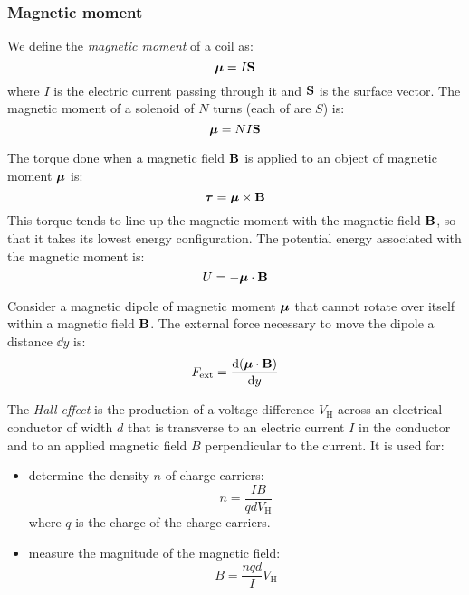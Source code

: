 \documentclass[../../../main.tex]{subfiles}
\begin{document}
\begin{multicols}{2}
  \subsubsection*{Magnetic moment}
  \begin{definition}
    We define the \textit{magnetic moment} of a coil as: $$\vb*{\mu}=I\vb{S}$$ where $I$ is the electric current passing through it and $\vb{S}$ is the surface vector. The magnetic moment of a solenoid of $N$ turns (each of are $S$) is: $$\vb*{\mu}=NI\vb{S}$$
  \end{definition}
  \begin{prop}
    The torque done when a magnetic field $\vb{B}$ is applied to an object of magnetic moment $\vb*{\mu}$ is: $$\vb*{\tau}=\vb*{\mu}\times\vb{B}$$ This torque tends to line up the magnetic moment with the magnetic field $\vb{B}$, so that it takes its lowest energy configuration. The potential energy associated with the magnetic moment is: $$U=-\vb*{\mu}\cdot\vb{B}$$
  \end{prop}
  \begin{prop}
    Consider a magnetic dipole of magnetic moment $\vb*{\mu}$ that cannot rotate over itself within a magnetic field $\vb{B}$. The external force necessary to move the dipole a distance $\dd y$ is: $$F_\text{ext}=\dv{(\vb*{\mu}\cdot\vb{B})}{y}$$
  \end{prop}
  \begin{prop}
    The \textit{Hall effect} is the production of a voltage difference $V_\text{H}$ across an electrical conductor of width $d$ that is transverse to an electric current $I$ in the conductor and to an applied magnetic field $B$ perpendicular to the current.
    It is used for:
    \begin{itemize}
      \item determine the density $n$ of charge carriers: $$n=\frac{IB}{qdV_\text{H}}$$ where $q$ is the charge of the charge carriers.
      \item measure the magnitude of the magnetic field: $$B=\frac{nqd}{I}V_\text{H}$$
    \end{itemize}
  \end{prop}
  \begin{center}
    \begin{minipage}{\linewidth}
      \centering
      
    \end{minipage}
  \end{center}

\end{multicols}
\end{document}
